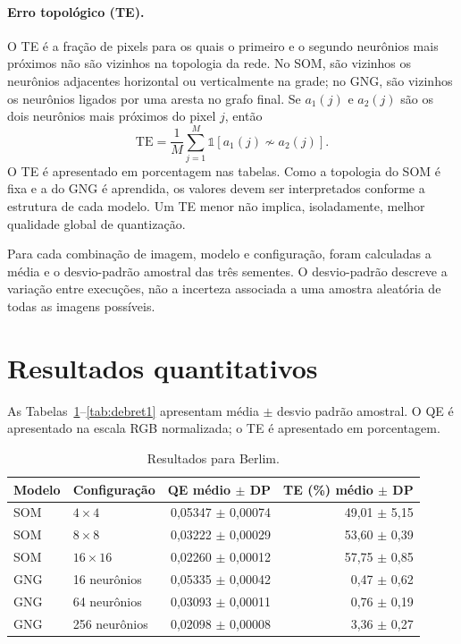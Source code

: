 \documentclass[11pt,a4paper]{article}
\begin{document}
\paragraph{Erro topológico (TE).}
O TE é a fração de pixels para os quais o primeiro e o segundo neurônios mais
próximos não são vizinhos na topologia da rede. No SOM, são vizinhos os
neurônios adjacentes horizontal ou verticalmente na grade; no GNG, são
vizinhos os neurônios ligados por uma aresta no grafo final. Se \(a_1(j)\) e
\(a_2(j)\) são os dois neurônios mais próximos do pixel \(j\), então
\[
\mathrm{TE}=\frac{1}{M}\sum_{j=1}^{M}
\mathbb{1}\!\left[a_1(j)\not\sim a_2(j)\right].
\]
O TE é apresentado em porcentagem nas tabelas. Como a topologia do SOM é fixa
e a do GNG é aprendida, os valores devem ser interpretados conforme a
estrutura de cada modelo. Um TE menor não implica, isoladamente, melhor
qualidade global de quantização.

Para cada combinação de imagem, modelo e configuração, foram calculadas a
média e o desvio-padrão amostral das três sementes. O desvio-padrão descreve a
variação entre execuções, não a incerteza associada a uma amostra aleatória de
todas as imagens possíveis.

\section{Resultados quantitativos}

As Tabelas~\ref{tab:berlim}--\ref{tab:debret1} apresentam média \(\pm\) desvio
padrão amostral. O QE é apresentado na escala RGB normalizada; o TE é
apresentado em porcentagem.

\begin{table}[H]
\centering
\caption{Resultados para Berlim.}
\label{tab:berlim}
\small
\begin{tabular}{llrr}
\toprule
Modelo & Configuração & QE médio \(\pm\) DP & TE (\%) médio \(\pm\) DP\\
\midrule
SOM & \(4\times4\) & 0,05347 \(\pm\) 0,00074 & 49,01 \(\pm\) 5,15\\
SOM & \(8\times8\) & 0,03222 \(\pm\) 0,00029 & 53,60 \(\pm\) 0,39\\
SOM & \(16\times16\) & 0,02260 \(\pm\) 0,00012 & 57,75 \(\pm\) 0,85\\
GNG & 16 neurônios & 0,05335 \(\pm\) 0,00042 & 0,47 \(\pm\) 0,62\\
GNG & 64 neurônios & 0,03093 \(\pm\) 0,00011 & 0,76 \(\pm\) 0,19\\
GNG & 256 neurônios & 0,02098 \(\pm\) 0,00008 & 3,36 \(\pm\) 0,27\\
\bottomrule
\end{tabular}
\end{table}
\end{document}
